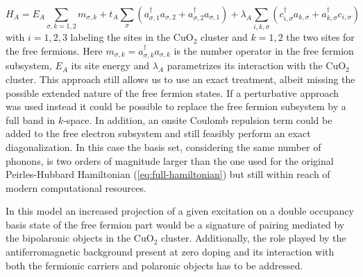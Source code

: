 \begin{equation}
  \label{eq:multicomponent}
  H_A = 
  E_A \sum_{\sigma, k=1,2} m_{\sigma, k} + 
  t_A \sum_{\sigma} (a_{\sigma, 1}^\dagger a_{\sigma, 2} + a_{\sigma,2}^\dagger a_{\sigma, 1}) + 
  \lambda_A \sum_{i,k,\sigma} \left( c_{i,\sigma}^\dagger a_{k,\sigma} + a_{k,\sigma}^\dagger c_{i,\sigma} \right) 
\end{equation}
% 
with $i=1,2,3$ labeling the sites in the CuO$_2$ cluster and $k=1,2$ the two sites for the free fermions. 
Here $m_{\sigma, k} = a_{\sigma, k}^\dagger a_{\sigma, k}$ is the number operator in the free fermion subsystem, $E_A$ its site energy and $\lambda_A$ parametrizes its interaction with the CuO$_2$ cluster.
This approach still allows us to use an exact treatment, albeit missing the possible extended nature of the free fermion states. 
If a perturbative approach was used instead it could be possible to replace the free fermion subsystem by a full band in $k$-space. 
In addition, an onsite Coulomb repulsion term could be added to the free electron subsystem and still feasibly perform an exact diagonalization. 
In this case the basis set, considering the same number of phonons, is two orders of magnitude larger than the one used for the original Peirles-Hubbard Hamiltonian (\ref{eq:full-hamiltonian}) but still within reach of modern computational resources.
 
In this model an increased projection of a given excitation on a double occupancy basis state of the free fermion part would be a signature of pairing mediated by the bipolaronic objects in the CuO$_2$ cluster. 
Additionally, the role played by the antiferromagnetic background present at zero doping and its interaction with both the fermionic carriers and polaronic objects has to be addressed.

